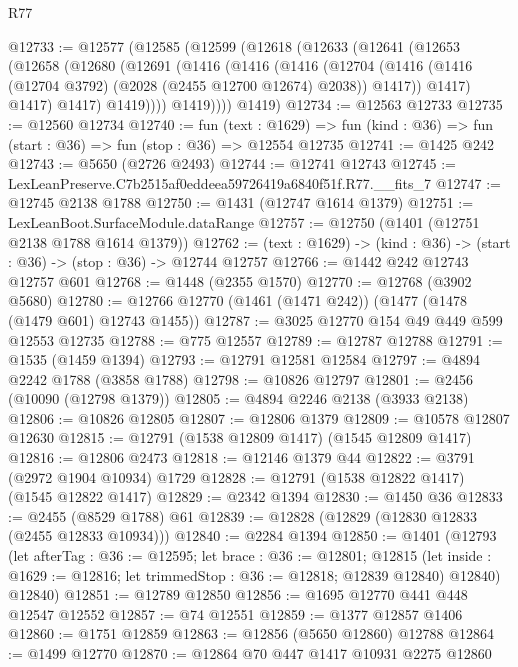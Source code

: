 \begin{lexlean}{R77}
\begin{coremodule}
{{@12733 := @12577
    (@12585
      (@12599
        (@12618
          (@12633
            (@12641
              (@12653
                (@12658
                  (@12680
                    (@12691
                      (@1416
                        (@1416
                          (@1416
                            (@12704
                              (@1416
                                (@1416 (@12704 @3792) (@2028 (@2455 @12700 @12674) @2038))
                                @1417))
                            @1417)
                          @1417)
                        @1417)
                      @1419))))
              @1419))))
      @1419)
@12734 := @12563 @12733
@12735 := @12560 @12734
@12740 := fun (text : @1629) =>
  fun (kind : @36) => fun (start : @36) => fun (stop : @36) => @12554 @12735
@12741 := @1425 @242
@12743 := @5650 (@2726 @2493)
@12744 := @12741 @12743
@12745 := LexLeanPreserve.C7b2515af0eddeea59726419a6840f51f.R77.__fits_7
@12747 := @12745 @2138 @1788
@12750 := @1431 (@12747 @1614 @1379)
@12751 := LexLeanBoot.SurfaceModule.dataRange
@12757 := @12750 (@1401 (@12751 @2138 @1788 @1614 @1379))
@12762 := (text : @1629) -> (kind : @36) -> (start : @36) -> (stop : @36) -> @12744 @12757
@12766 := @1442 @242 @12743 @12757 @601
@12768 := @1448 (@2355 @1570)
@12770 := @12768 (@3902 @5680)
@12780 := @12766 @12770 (@1461 (@1471 @242)) (@1477 (@1478 (@1479 @601) @12743 @1455))
@12787 := @3025 @12770 @154 @49 @449 @599 @12553 @12735
@12788 := @775 @12557
@12789 := @12787 @12788
@12791 := @1535 (@1459 @1394)
@12793 := @12791 @12581 @12584
@12797 := @4894 @2242 @1788 (@3858 @1788)
@12798 := @10826 @12797
@12801 := @2456 (@10090 (@12798 @1379))
@12805 := @4894 @2246 @2138 (@3933 @2138)
@12806 := @10826 @12805
@12807 := @12806 @1379
@12809 := @10578 @12807 @12630
@12815 := @12791 (@1538 @12809 @1417) (@1545 @12809 @1417)
@12816 := @12806 @2473
@12818 := @12146 @1379 @44
@12822 := @3791 (@2972 @1904 @10934) @1729
@12828 := @12791 (@1538 @12822 @1417) (@1545 @12822 @1417)
@12829 := @2342 @1394
@12830 := @1450 @36
@12833 := @2455 (@8529 @1788) @61
@12839 := @12828 (@12829 (@12830 @12833 (@2455 @12833 @10934)))
@12840 := @2284 @1394
@12850 := @1401
    (@12793
      (let afterTag : @36 := @12595;
      let brace : @36 := @12801;
      @12815 (let inside : @1629 := @12816; let trimmedStop : @36 := @12818; @12839 @12840) @12840)
      @12840)
@12851 := @12789 @12850
@12856 := @1695 @12770 @441 @448 @12547 @12552
@12857 := @74 @12551
@12859 := @1377 @12857 @1406
@12860 := @1751 @12859
@12863 := @12856 (@5650 @12860) @12788
@12864 := @1499 @12770
@12870 := @12864 @70 @447 @1417 @10931 @2275 @12860
}}
\end{coremodule}
\end{lexlean}
